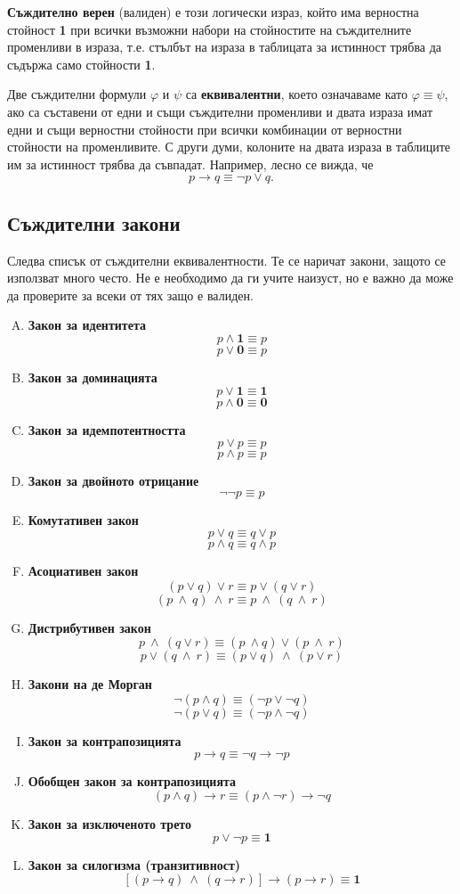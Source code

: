 {\bf Съждително верен} (валиден) е този логически израз, който има верностна стойност {\bf 1} при всички възможни набори на
стойностите на съждителните променливи в израза, т.е. стълбът на израза в таблицата за истинност трябва да съдържа само 
стойности {\bf 1}. 

Две съждителни формули $\varphi$ и $\psi$ са {\bf еквивалентни}, което означаваме като $\varphi \equiv \psi$, 
ако са съставени от едни и същи съждителни променливи и двата израза имат едни и същи верностни стойности при всички комбинации от
верностни стойности на променливите. С други думи, колоните на двата израза в таблиците им за истинност трябва да съвпадат.
Например, лесно се вижда, че 
\[p\to q \equiv \neg p \vee q.\]

\subsection*{Съждителни закони}

Следва списък от съждителни еквивалентности.
Те се наричат закони, защото се използват много често.
Не е необходимо да ги учите наизуст, но е важно да може да
проверите за всеки от тях защо е валиден.

\begin{enumerate}[A)]
\item
  {\bf Закон за идентитета}
  \[p \land \mathbf{1} \equiv p\]
  \[p \lor \mathbf{0} \equiv p\]
\item
  {\bf Закон за доминацията}
  \[p \lor \mathbf{1} \equiv \mathbf{1}\]
  \[p \land \mathbf{0} \equiv \mathbf{0}\]
\item
  {\bf Закон за идемпотентността}
  \[p \lor p \equiv p\]
  \[p \land p \equiv p\]
\item
  {\bf Закон за двойното отрицание}
  \[\neg \neg p \equiv p\]
\item
  {\bf Комутативен закон}
  \[p\vee q \equiv q\vee p\] 
  \[p \wedge q \equiv q \wedge p\]
\item
  {\bf Асоциативен закон}
  \[(p\vee q)\vee r \equiv p\vee(q\vee r)\]
  \[(p\ \wedge\ q)\ \wedge\ r \equiv p\ \wedge\ (q\ \wedge\ r)\]
\item
  {\bf Дистрибутивен закон}
  \[p\ \wedge\ (q \vee r) \equiv (p\ \wedge q)\vee (p\ \wedge\ r)\]
  \[p\vee (q\ \wedge\ r) \equiv (p\vee q)\ \wedge\ (p\vee r)\]
\item
  {\bf Закони на де Морган}
  \[\neg(p \wedge q) \equiv (\neg p \vee \neg q)\]
  \[\neg(p\vee q) \equiv (\neg p \wedge \neg q)\]
\item
  {\bf Закон за контрапозицията}
  \[p\rightarrow q \equiv \neg q \rightarrow \neg p\]
\item
  {\bf Обобщен закон за контрапозицията}
  \[(p \wedge q)\rightarrow r \equiv (p \wedge \neg r) \rightarrow \neg q\]
\item
  {\bf Закон за изключеното трето}
  \[p\vee \neg p \equiv {\mathbf 1}\]
\item
  {\bf Закон за силогизма (транзитивност)}
  \[[(p\rightarrow q)\ \wedge\ (q\rightarrow r)] \rightarrow (p\rightarrow r) \equiv {\mathbf 1}\]
\end{enumerate}

